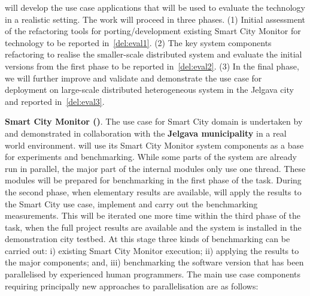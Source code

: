 \begin{Workpackage}{\thewpno}
\begin{Task}
\theTask{} will develop the use case applications that will be used to evaluate the \TheProject{} technology in a realistic setting. The work will proceed in three phases. 
(1) Initial assessment of the refactoring tools for porting/development existing Smart City Monitor for \TheProject{} technology to be reported in~\ref{del:eval1}. 
(2) The key system components refactoring to realise the smaller-scale distributed system and evaluate the initial versions from the first phase to be reported in~\ref{del:eval2}. 
(3) In the final phase, we will further improve and validate and demonstrate the use case for deployment on large-scale distributed heterogeneous system in the Jelgava city and reported in~\ref{del:eval3}. 

\textbf{Smart City Monitor (\GOLEMshort)}. The use case for Smart City domain is undertaken by \GOLEMshort and demonstrated in collaboration with the \textbf{Jelgava municipality} in a real world environment. \GOLEMshort will use its Smart City Monitor system components as a base for experiments and benchmarking. 
While some parts of the system are already run in parallel, the major part of the 
internal modules only use one thread. These modules will be prepared for benchmarking in the first phase of the task. During the second phase, when elementary \TheProject results are available, \GOLEMshort will apply the \TheProject results to the Smart City use case, implement and carry out the benchmarking measurements. This will be iterated one more time within the third phase of the task, when the full project results are available and the system is installed in the demonstration city testbed. 
At this stage three kinds of benchmarking can be carried out: i) existing Smart City Monitor execution; 
ii) applying the \TheProject{} results to the major components; and, 
iii) benchmarking the software version that has been parallelised by experienced 
human programmers. The main use case components requiring principally new approaches to parallelisation are as follows:



\end{Task}
\end{Workpackage}
